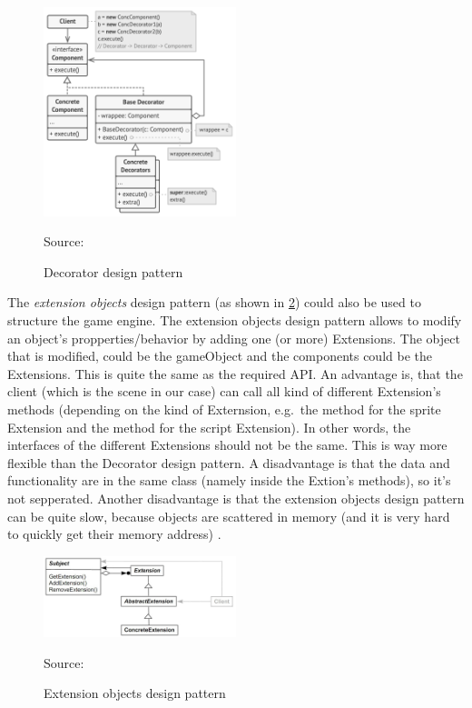 \documentclass{projdoc}
\begin{document}
\begin{figure}
	\centering
	\includegraphics[width=0.5\textwidth]{img/DecoratorDesignPattern.png}
	\caption{Decorator design pattern}
	Source: \autocite{img:Decorator}
	\label{fig:decorator}
\end{figure}

The \emph{extension objects} design pattern (as shown in \cref{fig:dp:ext-objs})
could also be used to structure the game engine. The extension objects design pattern
allows to modify an object's propperties/behavior by adding one (or more) Extensions.
The object that is modified, could be the gameObject and the components could be the
Extensions. This is quite the same as the required API. An advantage is, that the
client (which is the scene in our case) can call all kind of different Extension's
methods (depending on the kind of Externsion, e.g.~the method 
for the sprite Extension and the method  for the script
Extension). In other words, the interfaces of the different Extensions should not be
the same. This is way more flexible than the Decorator design pattern. A disadvantage
is that the data and functionality are in the same class (namely inside the Extion's
methods), so it's not sepperated. Another disadvantage is that the extension objects
design pattern can be quite slow, because objects are scattered in memory (and it is
very hard to quickly get their memory address)
\autocite{man:ExtensionObjectDesignPattern, man:extionsionObjectsStackOverflow}.

\begin{figure}
	\centering
	\includegraphics[width=0.5\textwidth]{img/ExtensionObjects.jpg}
	\caption{Extension objects design pattern}
	Source: \autocite{img:extionsionObjects}
	\label{fig:dp:ext-objs}
\end{figure}
\end{document}

